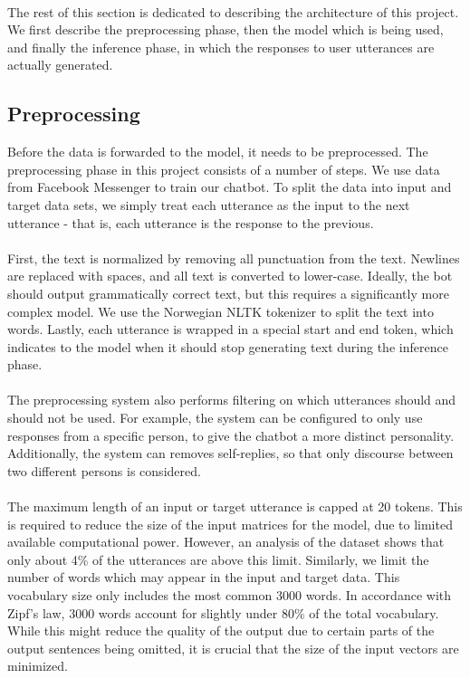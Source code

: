 \documentclass{article}
\begin{document}
\paragraph{}
The rest of this section is dedicated to describing the architecture of
this project. We first describe the preprocessing phase, then the model which
is being used, and finally the inference phase, in which the responses to user
utterances are actually generated.

\subsection*{Preprocessing}
Before the data is forwarded to the model, it needs to be preprocessed. The
preprocessing phase in this project consists of a number of steps. We use
data from Facebook Messenger to train our chatbot. To split the data into
input and target data sets, we simply treat each utterance as the input to
the next utterance - that is, each utterance is the response to the previous.

\paragraph{}
First, the text is normalized by removing all punctuation from the text. Newlines
are replaced with spaces, and all text is converted to lower-case. Ideally,
the bot should output grammatically correct text, but this requires a
significantly more complex model. We use the Norwegian NLTK tokenizer to split
the text into words. Lastly, each utterance is wrapped in a special start and
end token, which indicates to the model when it should stop generating text
during the inference phase.

\paragraph{}
The preprocessing system also performs filtering on which utterances should
and should not be used. For example, the system can be configured to only
use responses from a specific person, to give the chatbot a more distinct
personality. Additionally, the system can removes self-replies, so that
only discourse between two different persons is considered.

\paragraph{}
The maximum length of an input or target utterance is capped at 20 tokens.
This is required to reduce the size of the input matrices for the model, due
to limited available computational power. However, an analysis of the dataset
shows that only about 4\% of the utterances are above this limit. Similarly,
we limit the number of words which may appear in the input and target data.
This vocabulary size only includes the most common 3000 words. In accordance
with Zipf's law, 3000 words account for slightly under 80\% of the total
vocabulary. While this might reduce the quality of the output due to certain
parts of the output sentences being omitted, it is crucial that the size of
the input vectors are minimized.
\end{document}
